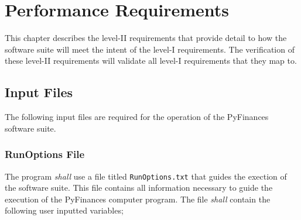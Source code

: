 \chapter{Performance Requirements}

This chapter describes the level-II requirements that provide detail to 
how the software suite will meet the intent of the level-I requirements.
The verification of these level-II requirements will validate all level-I
requirements that they map to.

\section{Input Files}
The following input files are required for the operation of the PyFinances 
software suite.

\subsection{RunOptions File}
The program {\textit{shall}} use a file titled {\texttt{RunOptions.txt}} that
guides the exection of the software suite.  This file contains all information
necessary to guide the execution of the PyFinances computer program.
The file {\textit{shall}} contain the following user inputted variables;

